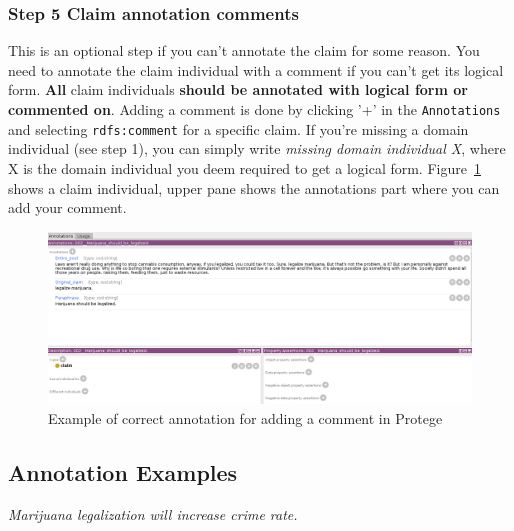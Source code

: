 \subsubsection*{Step 5 Claim annotation comments}

This is an optional step if you can't annotate the claim for some reason. You
need to annotate the claim individual with a comment if you can't get its
logical form. \textbf{All} claim individuals \textbf{should be annotated with logical form or
commented on}. Adding a comment is done by clicking '+' in the \texttt{Annotations} and
selecting \texttt{rdfs:comment} for a specific claim. If you're missing a domain
individual (see step 1), you can simply write \textit{missing domain individual X},
where X is the domain individual you deem required to get a logical form. 
Figure~\ref{fig:comment_example} shows 
a claim individual, upper pane shows the annotations part where
you can add your comment. 

\begin{figure}
	\includegraphics[scale=0.35]{comment.png}
	\caption{Example of correct annotation for adding a comment in Protege}
	\label{fig:comment_example}
\end{figure}

\subsection*{Annotation Examples}

\begin{mydef}
 \textit{Marijuana legalization will increase crime rate. }
\end{mydef}

